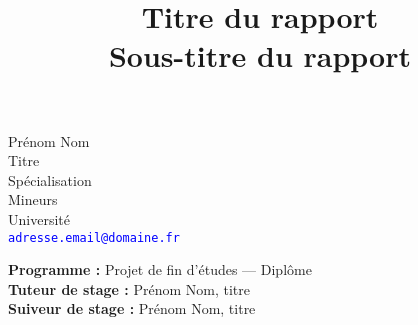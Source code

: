 


\large  %

\title{\vspace*{10pt}\Huge{\textbf{Titre du rapport}}\\
\vspace*{15pt}
\Large{Sous-titre du rapport} }

\thispagestyle{plain}

\date{}   %
\maketitle


\hr{}  %

\renewcommand{\thefootnote}{\fnsymbol{footnote}}
\begin{Large}
\begin{center}
    Prénom Nom\\
    \vspace*{25pt}
    Titre\\
    Spécialisation \\
    Mineurs\\
    Université\\
    \textcolor{blue}{\texttt{{adresse}{.}{email}{{@}}{domaine}{.}{fr}}}
    \vspace*{25pt}
\end{center}
\end{Large}


\begin{large}
    \begin{center}
        \textbf{Programme :} Projet de fin d'études — Diplôme \\
        \textbf{Tuteur de stage :} Prénom Nom, titre \\
        \textbf{Suiveur de stage :} Prénom Nom, titre \\
    \end{center}
\end{large}

